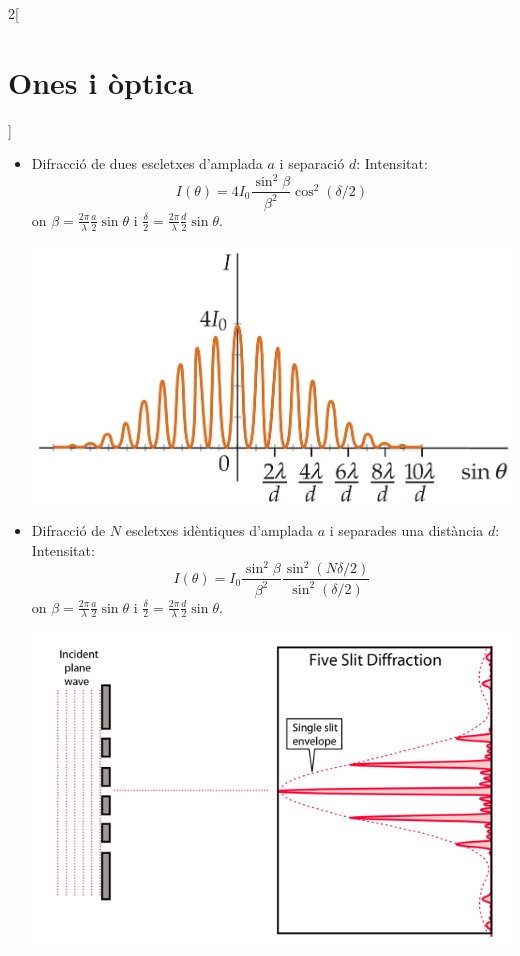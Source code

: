 \documentclass[class=article,10pt,crop=false]{standalone}
\begin{document}
\begin{multicols}{2}[\section{Ones i òptica}]
\begin{itemize}
\begin{itemize}
        \item Difracció de dues escletxes d'am\-pla\-da $a$ i separació $d$:\newline
        Intensitat: $$I(\theta)=4I_0\frac{\sin^2\beta}{\beta^2}\cos^2(\delta/2)$$ {\footnotesize on $\beta=\frac{2\pi}{\lambda}\frac{a}{2}\sin\theta$ i $\frac{\delta}{2}=\frac{2\pi}{\lambda}\frac{d}{2}\sin\theta$.}\newline      \begin{minipage}{\linewidth}
            \includegraphics[width=\linewidth]{Physics/1st/Waves_and_optics/Images/dif2.jpg} 
        \end{minipage}
        \item Difracció de $N$ escletxes i\-dèn\-ti\-ques d'amplada $a$ i separades una distància $d$:\newline
        Intensitat: $$I(\theta)=I_0\frac{\sin^2\beta}{\beta^2}\frac{\sin^2(N\delta/2)}{\sin^2(\delta/2)}$$ {\footnotesize on $\beta=\frac{2\pi}{\lambda}\frac{a}{2}\sin\theta$ i $\frac{\delta}{2}=\frac{2\pi}{\lambda}\frac{d}{2}\sin\theta$.}\newline
        \begin{minipage}{\linewidth}
    \includegraphics[width=\linewidth]{Physics/1st/Waves_and_optics/Images/difn.png} 

\end{minipage}
\end{itemize}
\end{itemize}
\end{multicols}
\end{document}
